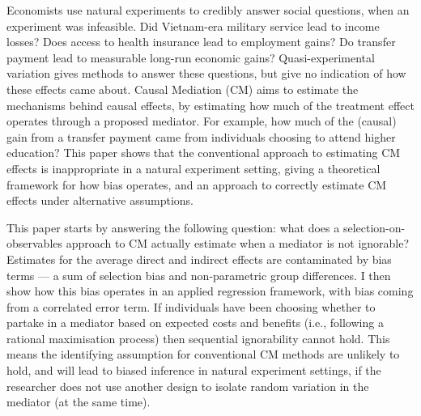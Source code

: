 Economists use natural experiments to credibly answer social questions, when an experiment was infeasible.
Did Vietnam-era military service lead to income losses?
Does access to health insurance lead to employment gains?
Do transfer payment  lead to measurable long-run economic gains?
Quasi-experimental variation gives methods to answer these questions, but give no indication of how these effects came about.
Causal Mediation (CM) aims to estimate the mechanisms behind causal effects, by estimating how much of the treatment effect operates through a proposed mediator.
For example, how much of the (causal) gain from a transfer payment came from individuals choosing to attend higher education?
This paper shows that the conventional approach to estimating CM effects is inappropriate in a natural experiment setting, giving a theoretical framework for how bias operates, and an approach to correctly estimate CM effects under alternative assumptions.

This paper starts by answering the following question: what does a selection-on-observables approach to CM actually estimate when a mediator is not ignorable?
Estimates for the average direct and indirect effects are contaminated by bias terms --- a sum of selection bias and non-parametric group differences.
I then show how this bias operates in an applied regression framework, with bias coming from a correlated error term.
If individuals have been choosing whether to partake in a mediator based on expected costs and benefits (i.e., following a rational maximisation process) then sequential ignorability cannot hold.
This means the identifying assumption for conventional CM methods are unlikely to hold, and will lead to biased inference in natural experiment settings, if the researcher does not use another design to isolate random variation in the mediator (at the same time).

